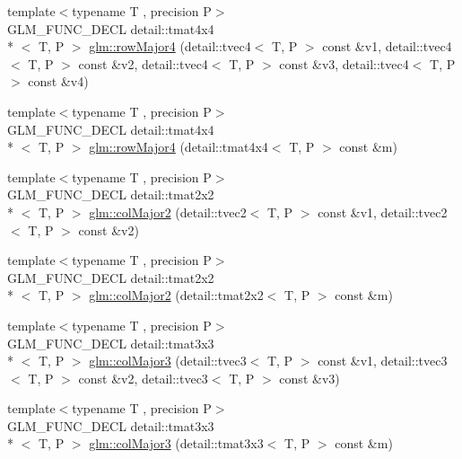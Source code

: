 \begin{DoxyCompactItemize}
{\footnotesize template$<$typename T , precision P$>$ }\\G\-L\-M\-\_\-\-F\-U\-N\-C\-\_\-\-D\-E\-C\-L detail\-::tmat4x4\\*
$<$ T, P $>$ \hyperlink{group__gtx__matrix__major__storage_gaba5dbb8fa29fcf57c80daf43ca7cf9db}{glm\-::row\-Major4} (detail\-::tvec4$<$ T, P $>$ const \&v1, detail\-::tvec4$<$ T, P $>$ const \&v2, detail\-::tvec4$<$ T, P $>$ const \&v3, detail\-::tvec4$<$ T, P $>$ const \&v4)
\item 
{\footnotesize template$<$typename T , precision P$>$ }\\G\-L\-M\-\_\-\-F\-U\-N\-C\-\_\-\-D\-E\-C\-L detail\-::tmat4x4\\*
$<$ T, P $>$ \hyperlink{group__gtx__matrix__major__storage_ga1a797d9a3f0d6b81e50b4f1bef2ed281}{glm\-::row\-Major4} (detail\-::tmat4x4$<$ T, P $>$ const \&m)
\item 
{\footnotesize template$<$typename T , precision P$>$ }\\G\-L\-M\-\_\-\-F\-U\-N\-C\-\_\-\-D\-E\-C\-L detail\-::tmat2x2\\*
$<$ T, P $>$ \hyperlink{group__gtx__matrix__major__storage_gae53863d1ced5629d5aa3ce04abf14ab1}{glm\-::col\-Major2} (detail\-::tvec2$<$ T, P $>$ const \&v1, detail\-::tvec2$<$ T, P $>$ const \&v2)
\item 
{\footnotesize template$<$typename T , precision P$>$ }\\G\-L\-M\-\_\-\-F\-U\-N\-C\-\_\-\-D\-E\-C\-L detail\-::tmat2x2\\*
$<$ T, P $>$ \hyperlink{group__gtx__matrix__major__storage_ga84d93f2dea8fd341232f0505038d50f6}{glm\-::col\-Major2} (detail\-::tmat2x2$<$ T, P $>$ const \&m)
\item 
{\footnotesize template$<$typename T , precision P$>$ }\\G\-L\-M\-\_\-\-F\-U\-N\-C\-\_\-\-D\-E\-C\-L detail\-::tmat3x3\\*
$<$ T, P $>$ \hyperlink{group__gtx__matrix__major__storage_ga8bc9dc6fcd7017b7123a151d9f251013}{glm\-::col\-Major3} (detail\-::tvec3$<$ T, P $>$ const \&v1, detail\-::tvec3$<$ T, P $>$ const \&v2, detail\-::tvec3$<$ T, P $>$ const \&v3)
\item 
{\footnotesize template$<$typename T , precision P$>$ }\\G\-L\-M\-\_\-\-F\-U\-N\-C\-\_\-\-D\-E\-C\-L detail\-::tmat3x3\\*
$<$ T, P $>$ \hyperlink{group__gtx__matrix__major__storage_ga40caccd20b8afb6de68c626efc376927}{glm\-::col\-Major3} (detail\-::tmat3x3$<$ T, P $>$ const \&m)

\end{DoxyCompactItemize}
